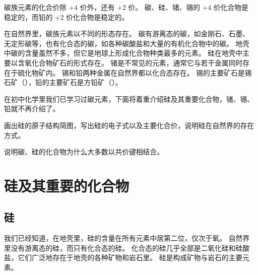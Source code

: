碳族元素的化合价除 $+4$ 价外，还有 $+2$ 价。
碳、硅、锗、锡的 $+4$ 价化合物是稳定的，而铅的 $+2$ 价化合物是稳定的。

在自然界里，碳族元素以不同的形态存在。
碳有游离态的碳，如金刚石、石墨、无定形碳等，也有化合态的碳，如各种碳酸盐和大量的有机化合物中的碳。
地壳中碳的含量虽然不多，但它是地球上形成化合物种类最多的元素。
硅在地壳中主要以含氧化合物矿石的形式存在。
锗是不常见的元素，通常它与若干金属同时存在于硫化物矿内。
锡和铅两种金属在自然界都以化合态存在。
锡的主要矿石是锡石矿（），铅的主要矿石是方铅矿（）。

在初中化学里我们已学习过碳元素，下面将着重介绍硅及其重要化合物，锗、锡、铅就不再介绍了。

\begin{Practice}[习题]
\begin{question}
  \item 画出硅的原子结构简图，写出硅的电子式以及主要化合价，说明硅在自然界的存在方式。
  \item 说明碳、硅的化合物为什么大多数以共价键相结合。
\end{question}
\end{Practice}

\section{硅及其重要的化合物}
\subsection{硅}
我们已经知道，在地壳里，硅的含量在所有元素中居第二位，仅次于氧。
自然界里没有游离态的硅，而只有化合态的硅。
化合态的硅几乎全部是二氧化硅和硅酸盐，它们广泛地存在于地壳的各种矿物和岩石里。
硅是构成矿物与岩石的主要元素。

